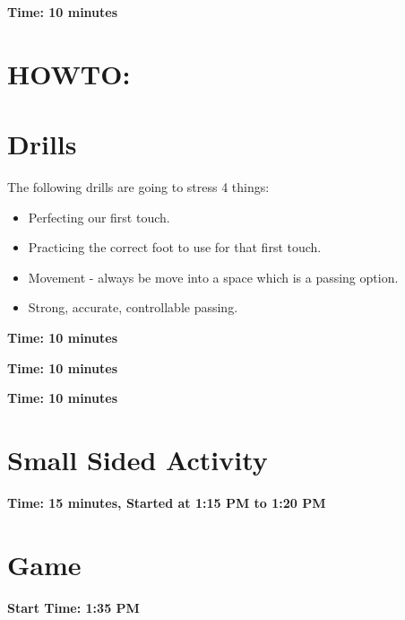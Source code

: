 \documentclass[10pt,letterpaper]{article}
\begin{document}
\textbf{Time: 10 minutes}


\section{HOWTO:}


\clearpage

\section{Drills}

The following drills are going to stress 4 things:
\begin{itemize}
    \setlength{\itemsep}{0pt}
    \setlength{\parskip}{0pt}
    \setlength{\parsep}{0pt}
    \item Perfecting our first touch.
    \item Practicing the correct foot to use for that first touch.
    \item Movement - always be move into a space which is a passing option.
    \item Strong, accurate, controllable passing.
\end{itemize}

\textbf{Time: 10 minutes}


\textbf{Time: 10 minutes}


\clearpage

\textbf{Time: 10 minutes}



%


\clearpage

\section{Small Sided Activity}
\textbf{Time: 15 minutes, Started at 1:15 PM to 1:20 PM}


\section{Game}

\textbf{Start Time: 1:35 PM}
\end{document}
